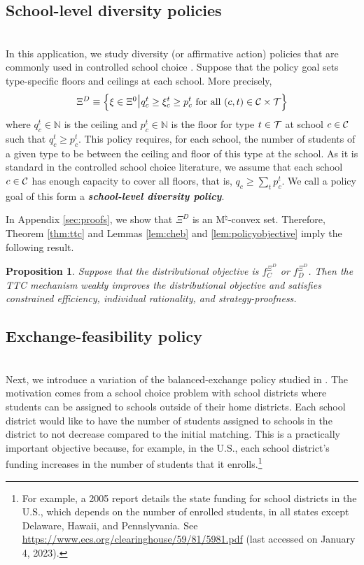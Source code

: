 \documentclass[12pt]{amsart}
\newtheorem{proposition}{Proposition}
\theoremstyle{remark}
\newcommand{\df}[1]{\textbf{\textit{#1}}}
\begin{document}
\subsection{School-level diversity policies}\label{sec:schoollevel}\hfill\\
In this application, we study diversity (or affirmative action) policies that are commonly used in controlled school choice \citep{ehayeyi14}.
Suppose that the policy goal sets type-specific floors and ceilings at each school. More precisely,
\[\Xi^D \equiv \left \{\xi \in \Xi^0 \mathlarger{\mathlarger{\mid}} q_c^t \geq \xi_c^t \geq p_c^t \text{ for all } (c,t)\in \calc \times \calt\right \}\]
where $q_c^t\in \mathbb N$ is the ceiling and $p_c^t\in \mathbb N$ is the floor for type $t\in \mathcal{T}$ at school $c\in \mathcal{C}$ such that $q_c^t  \geq p_c^t$.
This policy requires, for each school, the number of students of a given type to be between the ceiling and floor of this type at the school.
As it is standard in the controlled school choice literature, we assume that each school $c\in \mathcal{C}$ has enough capacity to cover all floors,
that is, $q_c \geq \sum_t p_c^t$. We call a policy goal of this form a \df{school-level diversity policy}.

In Appendix \ref{sec:proofs}, we show that $\Xi^D$ is an M$^{\natural}$-convex set.
Therefore, Theorem \ref{thm:ttc} and Lemmas \ref{lem:cheb} and \ref{lem:policyobjective} imply the following result.

\begin{proposition}\label{prop:convexdiv}
Suppose that the distributional objective is $f_C^{\Xi^D}$ or $f_D^{\Xi^D}$. Then the TTC mechanism weakly improves the distributional objective and satisfies constrained efficiency, individual rationality, and strategy-proofness.
\end{proposition}

\subsection{Exchange-feasibility policy}\label{subsec:bf}\hfill\\
Next, we introduce a variation of the balanced-exchange policy studied in \cite{hafalir2022interdistrict}.
The motivation comes from a school choice problem with school districts
where students can be assigned to schools outside of their home districts. Each school district would like to have the number of students assigned to schools in
the district to not decrease compared to the initial matching. This is a practically important objective because, for example, in the U.S., each school district's funding increases in the number of students that it enrolls.\footnote{For example, a 2005 report details the state funding for school districts in the U.S., which depends on the number of
enrolled students, in all states except Delaware, Hawaii, and Pennslyvania. See \href{https://www.ecs.org/clearinghouse/59/81/5981.pdf}{https://www.ecs.org/clearinghouse/59/81/5981.pdf} (last accessed on January 4, 2023).}
\end{document}
